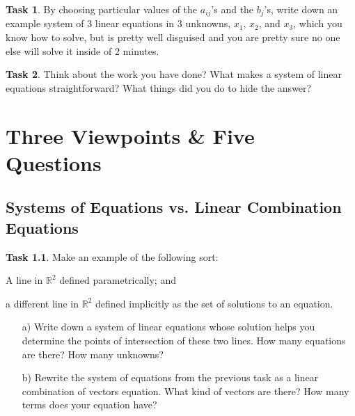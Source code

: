 \documentclass{tufte-book}
\theoremstyle{definition}
\newtheorem{task}{Task}
\begin{document}
\begin{task}
By choosing particular values of the $a_{ij}$'s and the $b_j$'s,
write down an example system of $3$ linear equations in $3$ unknowns, $x_1$, $x_2$, and $x_3$, which you know how to solve, but is pretty well disguised and you are pretty sure no one else will solve it inside of 2 minutes.
\end{task}

\begin{task}
Think about the work you have done? What makes a system of linear equations straightforward? What things did you do to hide the answer?
\end{task}


\chapter{Three Viewpoints \& Five Questions}

\section{Systems of Equations vs. Linear Combination Equations}

\begin{task}
Make an example of the following sort:
\begin{compactitem}
\item A line in $\mathbb{R}^2$ defined parametrically; and
\item a different line in $\mathbb{R}^2$ defined implicitly as the set of solutions to an equation.
\end{compactitem}
\begin{enumerate}
\item[a)] Write down a system of linear equations whose solution helps you determine the points of intersection of these two lines. How many equations are there? How many unknowns?

\item[b)] Rewrite the system of equations from the previous task as a linear combination of vectors equation. What kind of vectors are there? How many terms does your equation have?
\end{enumerate}
\end{task}
\end{document}
